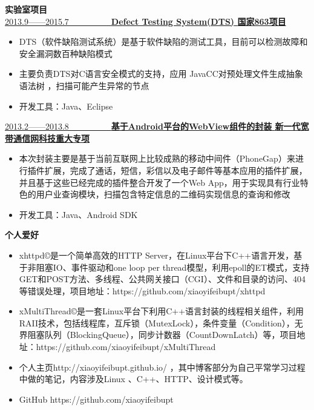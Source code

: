\documentclass[UTF8, winfonts]{ctexart}
\begin{document}
\noindent \textbf{ \heiti 实验室项目}\\
\uline{2013.9——2015.7~~~~~~~~~~\bf{Defect Testing System(DTS)} \hfill \bf{国家863项目}}
\begin{itemize}
  \setlength{\itemsep}{0pt}
  \setlength{\parsep}{3pt}
  \setlength{\parskip}{3pt}
  \item {}DTS（软件缺陷测试系统）是基于软件缺陷的测试工具，目前可以检测故障和安全漏洞数百种缺陷模式
  \item {}主要负责DTS对C语言安全模式的支持，应用 JavaCC对预处理文件生成抽象语法树 ，扫描可能产生异常的节点
  \item {}开发工具：Java、Eclipse
\end{itemize}
\uline{2013.2——2013.8~~~~~~~~~~\bf{基于Android平台的WebView组件的封装} \hfill \bf{新一代宽带通信网科技重大专项}}
\begin{itemize}
  \setlength{\itemsep}{0pt}
  \setlength{\parsep}{3pt}
  \setlength{\parskip}{3pt}
  \item {}本次封装主要是基于当前互联网上比较成熟的移动中间件（PhoneGap）来进行插件扩展，完成了通话，短信，彩信以及电子邮件等基本应用的插件扩展，并且基于这些已经完成的插件整合开发了一个Web App，用于实现具有行业特色的用户业查询模块，扫描包含特定信息的二维码实现信息的查询和修改
  \item {}开发工具：Java、Android SDK
\end{itemize}
\noindent \textbf{ \heiti 个人爱好}
\begin{itemize}
  \setlength{\itemsep}{0pt}
  \setlength{\parsep}{3pt}
  \setlength{\parskip}{3pt}
  \item {}xhttpd©是一个简单高效的HTTP Server，在Linux平台下C++语言开发，基于非阻塞IO、事件驱动和one loop per thread模型，利用epoll的ET模式，支持GET和POST方法、多线程、公共网关接口（CGI）、文件和目录的访问、404等错误处理，项目地址：https://github.com/xiaoyifeibupt/xhttpd
  \item {}xMultiThread©是一套Linux平台下利用C++语言封装的线程相关组件，利用RAII技术，包括线程库，互斥锁（MutexLock），条件变量（Condition），无界阻塞队列（BlockingQueue），同步计数器（CountDownLatch）等，项目地址：https://github.com/xiaoyifeibupt/xMultiThread
  \item {}个人主页http://xiaoyifeibupt.github.io/ ，其中博客部分为自己平常学习过程中做的笔记，内容涉及Linux 、C++、HTTP、设计模式等。
  \item {}GitHub https://github.com/xiaoyifeibupt
\end{itemize}
\end{document}
